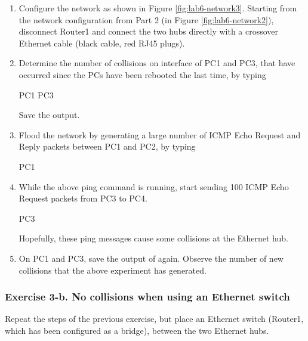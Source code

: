 \begin{enumerate}
	\item Configure the network as shown in Figure \ref{fig:lab6-network3}. Starting from the network configuration from Part 2 (in Figure \ref{fig:lab6-network2}), disconnect Router1 and connect the two hubs directly with a crossover Ethernet cable (black cable, red RJ45 plugs).
	\item Determine the number of collisions on interface  of PC1 and PC3, that have occurred since the PCs have been rebooted the last time, by typing
		\begin{cmdblock}
	PC1%
	PC3%
		\end{cmdblock}
		Save the output.
	\item Flood the network by generating a large number of ICMP Echo Request and Reply packets between PC1 and PC2, by typing
		\begin{cmdblock}
	PC1%
		\end{cmdblock}
	\item While the above ping command is running, start sending 100 ICMP Echo Request packets from PC3 to PC4.
		\begin{cmdblock}
	PC3%
		\end{cmdblock}
		Hopefully, these ping messages cause some collisions at the Ethernet hub.
	\item On PC1 and PC3, save the output of  again. Observe the number of new collisions that the above experiment has generated.
\end{enumerate}

\begin{questions}
\end{questions}	

\subsubsection{Exercise 3-b. No collisions when using an Ethernet switch}
Repeat the steps of the previous exercise, but place an Ethernet switch (Router1, which has been configured as a bridge), between the two Ethernet hubs.

